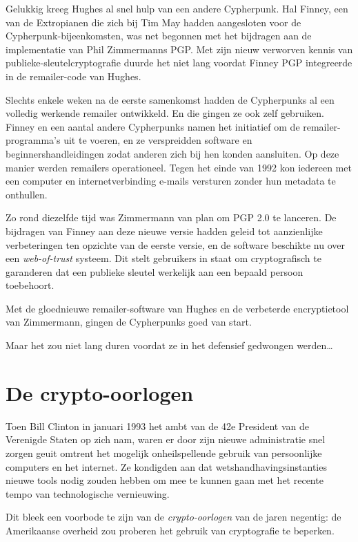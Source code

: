 \documentclass[
  a5paper,
  smalldemyvopaper,11pt,twoside,onecolumn,openright,extrafontsizes,
hidelinks]{memoir}
\begin{document}
Gelukkig kreeg Hughes al snel hulp van een andere Cypherpunk. Hal
Finney, een van de Extropianen die zich bij Tim May hadden aangesloten
voor de Cypherpunk-bijeenkomsten, was net begonnen met het bijdragen aan
de implementatie van Phil Zimmermanns PGP. Met zijn nieuw verworven
kennis van publieke-sleutelcryptografie duurde het niet lang voordat
Finney PGP integreerde in de remailer-code van Hughes.

Slechts enkele weken na de eerste samenkomst hadden de Cypherpunks al
een volledig werkende remailer ontwikkeld. En die gingen ze ook zelf
gebruiken. Finney en een aantal andere Cypherpunks namen het initiatief
om de remailer-programma's uit te voeren, en ze verspreidden software en
beginnershandleidingen zodat anderen zich bij hen konden aansluiten. Op
deze manier werden remailers operationeel. Tegen het einde van 1992 kon
iedereen met een computer en internetverbinding e-mails versturen zonder
hun metadata te onthullen.

Zo rond diezelfde tijd was Zimmermann van plan om PGP 2.0 te lanceren.
De bijdragen van Finney aan deze nieuwe versie hadden geleid tot
aanzienlijke verbeteringen ten opzichte van de eerste versie, en de
software beschikte nu over een \emph{web-of-trust} systeem. Dit stelt
gebruikers in staat om cryptografisch te garanderen dat een publieke
sleutel werkelijk aan een bepaald persoon toebehoort.

Met de gloednieuwe remailer-software van Hughes en de verbeterde
encryptietool van Zimmermann, gingen de Cypherpunks goed van start.

Maar het zou niet lang duren voordat ze in het defensief gedwongen
werden\ldots{}

\section{De crypto-oorlogen}\label{de-crypto-oorlogen}

Toen Bill Clinton in januari 1993 het ambt van de 42e President van de
Verenigde Staten op zich nam, waren er door zijn nieuwe administratie
snel zorgen geuit omtrent het mogelijk onheilspellende gebruik van
persoonlijke computers en het internet. Ze kondigden aan dat
wetshandhavingsinstanties nieuwe tools nodig zouden hebben om mee te
kunnen gaan met het recente tempo van technologische vernieuwing.

Dit bleek een voorbode te zijn van de \emph{crypto-oorlogen} van de
jaren negentig: de Amerikaanse overheid zou proberen het gebruik van
cryptografie te beperken.
\end{document}
